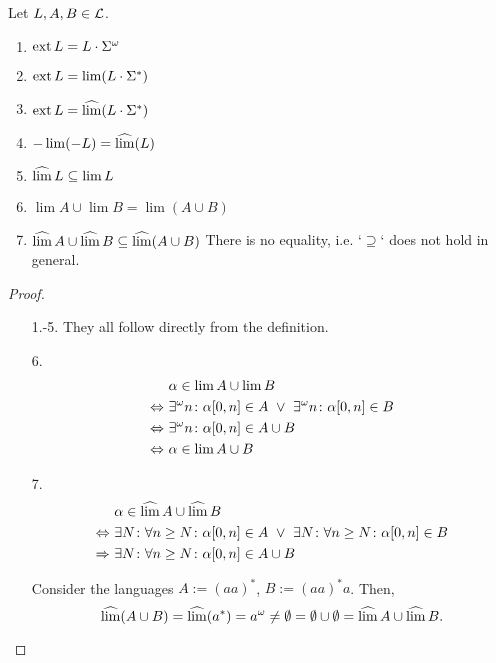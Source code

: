 \begin{lemma}
\label{gen:general}
Let $L,A,B \in \mathcal{L}$.
\begin{enumerate}
\item $\operatorname{ext} L = L \cdot \Sigma^\omega$
\item $\operatorname{ext} L = \lim(L \cdot \Sigma^*)$ %
\item $\operatorname{ext} L = \operatorname{\widehat{lim}}(L \cdot \Sigma^*)$ %
\item $- \lim(-L) = \operatorname{\widehat{lim}}(L)$
\item $\operatorname{\widehat{lim}} L \subseteq \lim L$
\item $\lim A \cup \lim B = \lim(A \cup B)$ %
\item $\operatorname{\widehat{lim}} A \cup \operatorname{\widehat{lim}} B \subseteq \operatorname{\widehat{lim}}(A \cup B)$ \newline %
There is no equality, i.e. `$\supseteq$` does not hold in general.
\end{enumerate}
\begin{proof}
\begin{enumerate}
\item[1.-5.] They all follow directly from the definition.
\item[6.] %
\begin{align*}
& \alpha \in \lim A \cup \lim B \\
\Leftrightarrow \ & \existsinf n \colon \alpha[0,n] \in A \ \vee \ \existsinf n \colon \alpha[0,n] \in B \\
\Leftrightarrow \ & \existsinf n \colon \alpha[0,n] \in A \cup B \\
\Leftrightarrow \ & \alpha \in \lim A \cup B
\end{align*}
\item[7.] %
\begin{align*}
& \alpha \in \dlim A \cup \dlim B \\
\Leftrightarrow \ & \exists N \colon \forall n \ge N \colon \alpha[0,n] \in A \ \vee \ 
\exists N \colon \forall n \ge N \colon \alpha[0,n] \in B \\
\Rightarrow \ & \exists N \colon \forall n \ge N \colon \alpha[0,n] \in A \cup B
\end{align*}

Consider the languages $A := (aa)^*$, $B := (aa)^*a$. Then,
\[ \operatorname{\widehat{lim}}(A \cup B) = \operatorname{\widehat{lim}}(a^*) = a^\omega \ne \emptyset = \emptyset \cup \emptyset = \operatorname{\widehat{lim}} A \cup \operatorname{\widehat{lim}} B . \]
\end{enumerate}
\end{proof}
\end{lemma}

